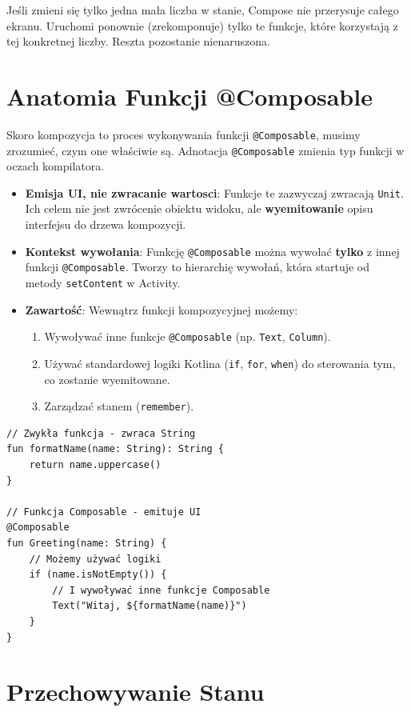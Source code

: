 Jeśli zmieni się tylko jedna mała liczba w stanie, Compose nie przerysuje całego ekranu. Uruchomi ponownie (zrekomponuje) tylko te funkcje, które korzystają z tej konkretnej liczby. Reszta pozostanie nienaruszona.

\section{Anatomia Funkcji @Composable}

Skoro kompozycja to proces wykonywania funkcji \texttt{@Composable}, musimy zrozumieć, czym one właściwie są. Adnotacja \texttt{@Composable} zmienia typ funkcji w oczach kompilatora.

\begin{itemize}
    \item \textbf{Emisja UI, nie zwracanie wartosci}: Funkcje te zazwyczaj zwracają \texttt{Unit}. Ich celem nie jest zwrócenie obiektu widoku, ale \textbf{wyemitowanie} opisu interfejsu do drzewa kompozycji.
    \item \textbf{Kontekst wywołania}: Funkcję \texttt{@Composable} można wywołać \textbf{tylko} z innej funkcji \texttt{@Composable}. Tworzy to hierarchię wywołań, która startuje od metody \texttt{setContent} w Activity.
    \item \textbf{Zawartość}: Wewnątrz funkcji kompozycyjnej możemy:
    \begin{enumerate}
        \item Wywoływać inne funkcje \texttt{@Composable} (np. \texttt{Text}, \texttt{Column}).
        \item Używać standardowej logiki Kotlina (\texttt{if}, \texttt{for}, \texttt{when}) do sterowania tym, co zostanie wyemitowane.
        \item Zarządzać stanem (\texttt{remember}).
    \end{enumerate}
\end{itemize}

\begin{verbatim}
// Zwykła funkcja - zwraca String
fun formatName(name: String): String {
    return name.uppercase()
}

// Funkcja Composable - emituje UI
@Composable
fun Greeting(name: String) {
    // Możemy używać logiki
    if (name.isNotEmpty()) {
        // I wywoływać inne funkcje Composable
        Text("Witaj, ${formatName(name)}")
    }
}
\end{verbatim}

\section{Przechowywanie Stanu}

